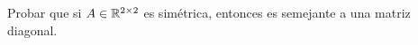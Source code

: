\item Probar que si $A\in\mathbb{R}^{2\times2}$ es simétrica, entonces es semejante a una matriz diagonal.
    \begin{mdframed}[style=s]
        
    \end{mdframed}